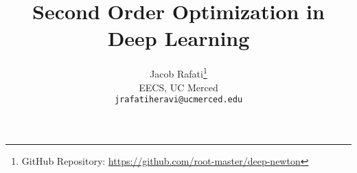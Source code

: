 \documentclass[letterpaper]{article}
\title{Second Order Optimization in Deep Learning}
\author{
  Jacob Rafati\thanks{GitHub Repository: \url{https://github.com/root-master/deep-newton}} \\
  EECS,  UC Merced\\
  \texttt{jrafatiheravi@ucmerced.edu} \\
}
\begin{document}
\maketitle

\begin{abstract}
\end{abstract}

\section{}



\end{document}
